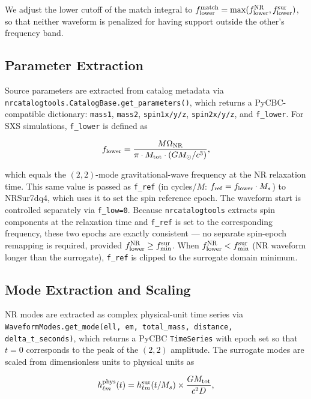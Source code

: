 \documentclass[%
 reprint,
superscriptaddress,
 amsmath,amssymb,
 aps,
]{revtex4-2}
\begin{document}
We adjust the lower cutoff of the match integral to $f_{\rm lower}^{\rm match} = \max(f_{\rm lower}^{\rm NR}, f_{\rm lower}^{\rm sur})$, so that neither waveform is penalized for having support outside the other's frequency band.

\subsection{Parameter Extraction}

Source parameters are extracted from catalog metadata via \texttt{nrcatalogtools.CatalogBase.get\_parameters()}, which returns a PyCBC-compatible dictionary: \texttt{mass1}, \texttt{mass2}, \texttt{spin1x/y/z}, \texttt{spin2x/y/z}, and \texttt{f\_lower}. For SXS simulations, \texttt{f\_lower} is defined as

\begin{equation}f_{\rm lower} = \frac{M\Omega_{\rm NR}}{\pi \cdot M_{\rm tot} \cdot (G M_\odot / c^3)},\end{equation}

which equals the $(2,2)$-mode gravitational-wave frequency at the NR relaxation time. This same value is passed as \texttt{f\_ref} (in cycles/$M$: $f_{\rm ref} = f_{\rm lower} \cdot M_s$) to NRSur7dq4, which uses it to set the spin reference epoch. The waveform start is controlled separately via \texttt{f\_low=0}. Because \texttt{nrcatalogtools} extracts spin components at the relaxation time and \texttt{f\_ref} is set to the corresponding frequency, these two epochs are exactly consistent — no separate spin-epoch remapping is required, provided $f_{\rm lower}^{\rm NR} \geq f_{\rm min}^{\rm sur}$. When $f_{\rm lower}^{\rm NR} < f_{\rm min}^{\rm sur}$ (NR waveform longer than the surrogate), \texttt{f\_ref} is clipped to the surrogate domain minimum.

\subsection{Mode Extraction and Scaling}

NR modes are extracted as complex physical-unit time series via \texttt{WaveformModes.get\_mode(ell, em, total\_mass, distance, delta\_t\_seconds)}, which returns a PyCBC \texttt{TimeSeries} with epoch set so that $t = 0$ corresponds to the peak of the $(2,2)$ amplitude. The surrogate modes are scaled from dimensionless units to physical units as

\begin{equation}h_{\ell m}^{\rm phys}(t) = h_{\ell m}^{\rm sur}(t/M_s) \times \frac{G M_{\rm tot}}{c^2 D},\end{equation}
\end{document}

